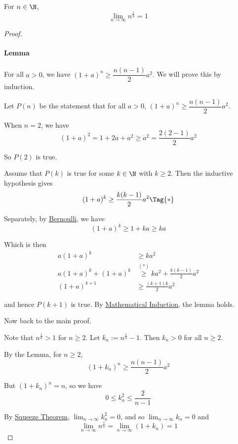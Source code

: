 \Theorem{}\label{c88c34b}

For $n\in\N$,
$$
  \lim_{n\to\infty}n^\frac1n=1
$$

\begin{proof}
  \def\nn{n^\frac1n}
  \paragraph{Lemma}

  For all $a>0$, we have $(1+a)^n\geq\dfrac{n(n-1)}{2}a^2$. We will prove this
  by induction.

  Let $P(n)$ be the statement that for all $a>0$,
  $(1+a)^n\geq\dfrac{n(n-1)}2a^2$.

  When $n=2$, we have
  $$
    (1+a)^2=1+2a+a^2\geq a^2=\frac{2(2-1)}2a^2
  $$

  So $P(2)$ is true.

  Assume that $P(k)$ is true for some $k\in\N$ with $k\geq2$. Then the
  inductive hypothesis gives
  \begin{equation*}
    (1+a)^k\geq\frac{k(k-1)}2a^2\Tag{*}
  \end{equation*}

  Separately, by \href{d44713f}{Bernoulli}, we have
  $$
    (1+a)^k\geq1+ka\geq ka
  $$

  Which is then
  \begin{align*}
    a(1+a)^k         &\geq ka^2                                   \\
    a(1+a)^k+(1+a)^k &\stackrel{(*)}{\geq} ka^2+\frac{k(k-1)}2a^2 \\
    (1+a)^{k+1}      &\geq \frac{(k+1)k}2a^2
  \end{align*}

  and hence $P(k+1)$ is true. By \href{b51ca45}{Mathematical Induction}, the
  lemma holds.

  Now back to the main proof.

  Note that $\nn>1$ for $n\geq2$. Let $k_n:=\nn-1$. Then $k_n>0$ for all
  $n\geq2$.

  By the Lemma, for $n\geq2$,
  $$
    (1+k_n)^n\geq\frac{n(n-1)}2a^2
  $$

  But $(1+k_n)^n=n$, so we have
  $$
    0\leq k_n^2\leq\frac2{n-1}
  $$

  By \href{c3364d9}{Squeeze Theorem}, $\displaystyle\lim_{n\to\infty}k_n^2=0$,
  and so $\displaystyle\lim_{n\to\infty}k_n=0$ and
  $$
    \lim_{n\to\infty}\nn=\lim_{n\to\infty}(1+k_n)=1
  $$
\end{proof}

